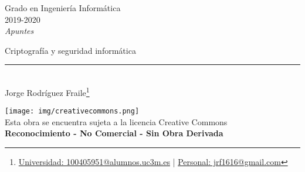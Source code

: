 \documentclass[12pt, twoside, openright]{report} %
\begin{document}

\begin{titlepage}
	\begin{sffamily}
		\color{azulUC3M}
		\begin{center}
			\begin{figure}[H] %
			\end{figure}
			\vspace{2.5cm}
			\begin{Large}
				Grado en Ingeniería Informática\\
				2019-2020\\
				\vspace{2cm}
				\textsl{Apuntes}\\
				\bigskip
			\end{Large}
			{\Huge Criptografía y seguridad informática}\\
			\vspace*{0.5cm}
			\rule{10.5cm}{0.1mm}\\
			\vspace*{0.9cm}
			{\LARGE Jorge Rodríguez Fraile\footnote{\href{mailto:100405951@alumnos.uc3m.es}{Universidad: 100405951@alumnos.uc3m.es} | \href{mailto:jrf1616@gmail.com}{Personal: jrf1616@gmail.com}}}\\
			\vspace*{1cm}
		\end{center}
		\vfill
		\color{black}
		\texttt{[image: img/creativecommons.png]}\\
		Esta obra se encuentra sujeta a la licencia Creative Commons\\ \textbf{Reconocimiento - No Comercial - Sin Obra Derivada}
	\end{sffamily}
\end{titlepage}


\tableofcontents
\thispagestyle{fancy}




\end{document}
